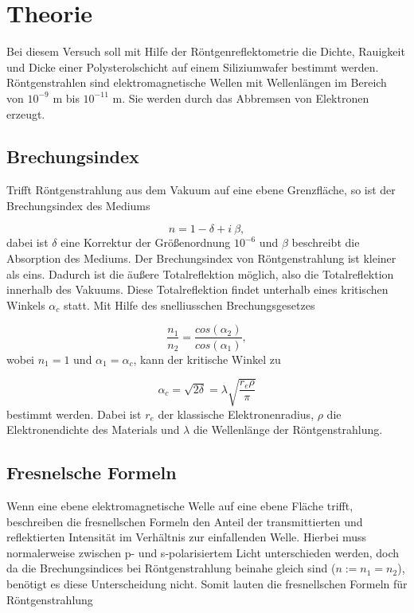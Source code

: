 \section{Theorie}
\label{sec:Theorie}
Bei diesem Versuch soll mit Hilfe der Röntgenreflektometrie die Dichte, Rauigkeit und Dicke einer Polysterolschicht 
auf einem Siliziumwafer bestimmt werden. 
Röntgenstrahlen sind elektromagnetische Wellen mit Wellenlängen im Bereich von $10^{-9}$ m bis $10^{-11}$ m.
Sie werden durch das Abbremsen von Elektronen erzeugt.

\subsection{Brechungsindex}
Trifft Röntgenstrahlung aus dem Vakuum auf eine ebene Grenzfläche, so ist der Brechungsindex des Mediums 

\begin{equation}
    n = 1- \delta + i \: \beta,
\end{equation}
dabei ist $\delta$ eine Korrektur der Größenordnung $10^{-6}$ und $\beta$ beschreibt die Absorption des Mediums.
Der Brechungsindex von Röntgenstrahlung ist kleiner als eins. Dadurch ist die äußere Totalreflektion möglich, also 
die Totalreflektion innerhalb des Vakuums.
Diese Totalreflektion findet unterhalb eines kritischen Winkels $\alpha_c$ statt.
Mit Hilfe des snelliusschen Brechungsgesetzes 

\begin{equation}
    \frac{n_1}{n_2} = \frac{cos(\alpha_2)}{cos(\alpha_1)},
\end{equation}
wobei $n_1 = 1$ und $\alpha_1 = \alpha_c$,
kann der kritische Winkel zu 

\begin{equation}
    \alpha_c = \sqrt{2 \delta} = \lambda \sqrt{\frac{r_e \rho}{\pi}}
\end{equation}
bestimmt werden.
Dabei ist $r_e$ der klassische Elektronenradius, $\rho$ die Elektronendichte des Materials und $\lambda$ die Wellenlänge der Röntgenstrahlung.



\subsection{Fresnelsche Formeln}
Wenn eine ebene elektromagnetische Welle auf eine ebene Fläche trifft, beschreiben die fresnellschen Formeln den Anteil der transmittierten und reflektierten Intensität 
im Verhältnis zur einfallenden Welle. Hierbei muss normalerweise zwischen p- und s-polarisiertem Licht unterschieden werden, doch da die Brechungsindices 
bei Röntgenstrahlung beinahe gleich sind ($n:= n_1 = n_2$), benötigt es diese Unterscheidung nicht.
Somit lauten die fresnellschen Formeln für Röntgenstrahlung

